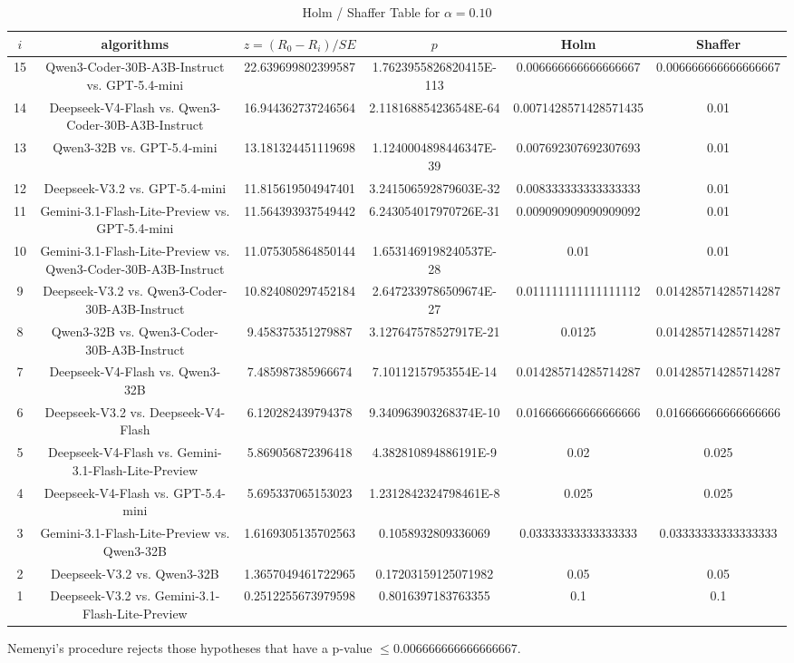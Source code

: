 \documentclass[a4paper,10pt]{article}
\begin{document}
\begin{landscape}
\begin{table}[!htp]
\centering\tiny
\caption{Holm / Shaffer Table for $\alpha=0.10$}
\begin{tabular}{cccccc}
$i$&algorithms&$z=(R_0 - R_i)/SE$&$p$&Holm&Shaffer\\
\hline
15&Qwen3-Coder-30B-A3B-Instruct vs. GPT-5.4-mini&22.639699802399587&1.7623955826820415E-113&0.006666666666666667&0.006666666666666667\\14&Deepseek-V4-Flash vs. Qwen3-Coder-30B-A3B-Instruct&16.944362737246564&2.118168854236548E-64&0.0071428571428571435&0.01\\13&Qwen3-32B vs. GPT-5.4-mini&13.181324451119698&1.1240004898446347E-39&0.007692307692307693&0.01\\12&Deepseek-V3.2 vs. GPT-5.4-mini&11.815619504947401&3.241506592879603E-32&0.008333333333333333&0.01\\11&Gemini-3.1-Flash-Lite-Preview vs. GPT-5.4-mini&11.564393937549442&6.243054017970726E-31&0.009090909090909092&0.01\\10&Gemini-3.1-Flash-Lite-Preview vs. Qwen3-Coder-30B-A3B-Instruct&11.075305864850144&1.6531469198240537E-28&0.01&0.01\\9&Deepseek-V3.2 vs. Qwen3-Coder-30B-A3B-Instruct&10.824080297452184&2.6472339786509674E-27&0.011111111111111112&0.014285714285714287\\8&Qwen3-32B vs. Qwen3-Coder-30B-A3B-Instruct&9.458375351279887&3.127647578527917E-21&0.0125&0.014285714285714287\\7&Deepseek-V4-Flash vs. Qwen3-32B&7.485987385966674&7.10112157953554E-14&0.014285714285714287&0.014285714285714287\\6&Deepseek-V3.2 vs. Deepseek-V4-Flash&6.120282439794378&9.340963903268374E-10&0.016666666666666666&0.016666666666666666\\5&Deepseek-V4-Flash vs. Gemini-3.1-Flash-Lite-Preview&5.869056872396418&4.382810894886191E-9&0.02&0.025\\4&Deepseek-V4-Flash vs. GPT-5.4-mini&5.695337065153023&1.2312842324798461E-8&0.025&0.025\\3&Gemini-3.1-Flash-Lite-Preview vs. Qwen3-32B&1.6169305135702563&0.1058932809336069&0.03333333333333333&0.03333333333333333\\2&Deepseek-V3.2 vs. Qwen3-32B&1.3657049461722965&0.17203159125071982&0.05&0.05\\1&Deepseek-V3.2 vs. Gemini-3.1-Flash-Lite-Preview&0.2512255673979598&0.8016397183763355&0.1&0.1\\\hline
\end{tabular}
\end{table}
Nemenyi's procedure rejects those hypotheses that have a p-value $\le0.006666666666666667$.



\end{landscape}
\end{document}
